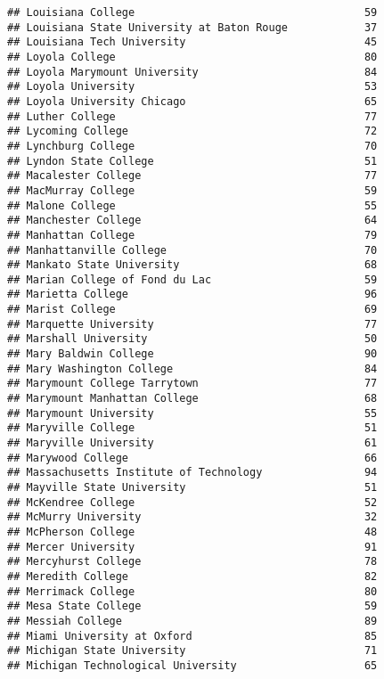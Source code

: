 \documentclass[
]{article}
\begin{document}
\begin{verbatim}
## Louisiana College                                    59
## Louisiana State University at Baton Rouge            37
## Louisiana Tech University                            45
## Loyola College                                       80
## Loyola Marymount University                          84
## Loyola University                                    53
## Loyola University Chicago                            65
## Luther College                                       77
## Lycoming College                                     72
## Lynchburg College                                    70
## Lyndon State College                                 51
## Macalester College                                   77
## MacMurray College                                    59
## Malone College                                       55
## Manchester College                                   64
## Manhattan College                                    79
## Manhattanville College                               70
## Mankato State University                             68
## Marian College of Fond du Lac                        59
## Marietta College                                     96
## Marist College                                       69
## Marquette University                                 77
## Marshall University                                  50
## Mary Baldwin College                                 90
## Mary Washington College                              84
## Marymount College Tarrytown                          77
## Marymount Manhattan College                          68
## Marymount University                                 55
## Maryville College                                    51
## Maryville University                                 61
## Marywood College                                     66
## Massachusetts Institute of Technology                94
## Mayville State University                            51
## McKendree College                                    52
## McMurry University                                   32
## McPherson College                                    48
## Mercer University                                    91
## Mercyhurst College                                   78
## Meredith College                                     82
## Merrimack College                                    80
## Mesa State College                                   59
## Messiah College                                      89
## Miami University at Oxford                           85
## Michigan State University                            71
## Michigan Technological University                    65

\end{verbatim}
\end{document}
